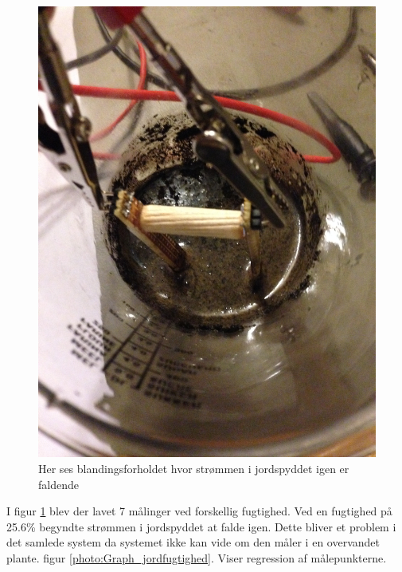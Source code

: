 \begin{figure}[H]
	\centering 
	\includegraphics[scale=0.08]{HardwareArkitektur/Sensore/Jordfugt_billeder/Maetningspunktet.JPG}
	\caption{Her ses blandingsforholdet hvor strømmen i jordspyddet igen er faldende}
	\label{photo:Maetningspunkt}
\end{figure}  

I figur \ref{photo:Maetningspunkt} blev der lavet 7 målinger ved forskellig fugtighed. Ved en fugtighed på 25.6\% begyndte strømmen i jordspyddet at falde igen. Dette bliver et problem i det samlede system da systemet ikke kan vide om den måler i en overvandet plante. figur \ref{photo:Graph_jordfugtighed}. Viser regression af målepunkterne. 

